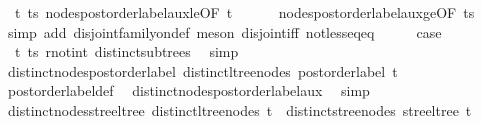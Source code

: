 \begin{isabellebody}
\ {}\ t{\isacharprime}{\kern0pt}\ ts{\isacharprime}{\kern0pt}\ nodes{\isacharunderscore}{\kern0pt}postorder{\isacharunderscore}{\kern0pt}label{\isacharunderscore}{\kern0pt}aux{\isacharunderscore}{\kern0pt}le{\isacharbrackleft}{\kern0pt}OF\ t{\isacharprime}{\kern0pt}{\isacharbrackright}{\kern0pt}\isanewline
\ \ \ \ \ \ nodes{\isacharunderscore}{\kern0pt}postorder{\isacharunderscore}{\kern0pt}label{\isacharunderscore}{\kern0pt}aux{\isacharunderscore}{\kern0pt}ge{\isacharbrackleft}{\kern0pt}OF\ ts{\isacharprime}{\kern0pt}{\isacharbrackright}{\kern0pt}\ \isamarkupfalse%
\ {\isacharparenleft}{\kern0pt}simp\ add{\isacharcolon}{\kern0pt}\ disjoint{\isacharunderscore}{\kern0pt}family{\isacharunderscore}{\kern0pt}on{\isacharunderscore}{\kern0pt}def{\isacharcomma}{\kern0pt}\ meson\ disjoint{\isacharunderscore}{\kern0pt}iff\ not{\isacharunderscore}{\kern0pt}less{\isacharunderscore}{\kern0pt}eq{\isacharunderscore}{\kern0pt}eq{\isacharparenright}{\kern0pt}\isanewline
\ \ \isamarkupfalse%
\ \isamarkupfalse%
\ {\isacharquery}{\kern0pt}case\ \isamarkupfalse%
\ {}\ t{\isacharprime}{\kern0pt}\ ts{\isacharprime}{\kern0pt}\ r{\isacharunderscore}{\kern0pt}notin{\isacharunderscore}{\kern0pt}t{\isacharprime}{\kern0pt}\ distinct{\isacharunderscore}{\kern0pt}subtrees\ \isamarkupfalse%
\ simp\isanewline
{}\isamarkupfalse%
%
\endisatagproof
{\isafoldproof}%
%
\isadelimproof
\isanewline
%
\endisadelimproof
\isanewline
{}\isamarkupfalse%
\ distinct{\isacharunderscore}{\kern0pt}nodes{\isacharunderscore}{\kern0pt}postorder{\isacharunderscore}{\kern0pt}label{\isacharcolon}{\kern0pt}\ {\isachardoublequoteopen}distinct{\isacharunderscore}{\kern0pt}ltree{\isacharunderscore}{\kern0pt}nodes\ {\isacharparenleft}{\kern0pt}postorder{\isacharunderscore}{\kern0pt}label\ t{\isacharparenright}{\kern0pt}{\isachardoublequoteclose}\isanewline
%
\isadelimproof
\ \ %
\endisadelimproof
%
\isatagproof
{}\isamarkupfalse%
\ postorder{\isacharunderscore}{\kern0pt}label{\isacharunderscore}{\kern0pt}def\ \isamarkupfalse%
\ distinct{\isacharunderscore}{\kern0pt}nodes{\isacharunderscore}{\kern0pt}postorder{\isacharunderscore}{\kern0pt}label{\isacharunderscore}{\kern0pt}aux\ \isamarkupfalse%
\ simp%
\endisatagproof
{\isafoldproof}%
%
\isadelimproof
\isanewline
%
\endisadelimproof
\isanewline
{}\isamarkupfalse%
\ distinct{\isacharunderscore}{\kern0pt}nodes{\isacharunderscore}{\kern0pt}stree{\isacharunderscore}{\kern0pt}ltree{\isacharcolon}{\kern0pt}\ {\isachardoublequoteopen}distinct{\isacharunderscore}{\kern0pt}ltree{\isacharunderscore}{\kern0pt}nodes\ t\ {\isasymLongrightarrow}\ distinct{\isacharunderscore}{\kern0pt}stree{\isacharunderscore}{\kern0pt}nodes\ {\isacharparenleft}{\kern0pt}stree{\isacharunderscore}{\kern0pt}ltree\ t{\isacharparenright}{\kern0pt}{\isachardoublequoteclose}\isanewline

\end{isabellebody}
